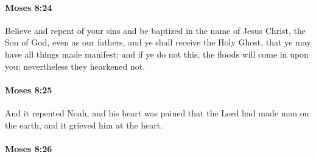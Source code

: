 
		\paragraph{Moses 8:24} %
			\label{MOSES-8-24}

			Believe and repent of your sins and be baptized in the name of Jesus Christ, the Son of God, even as our fathers, and ye shall receive the Holy Ghost, that ye may have all things made manifest; and if ye do not this, the floods will come in upon you; nevertheless they hearkened not.


		\paragraph{Moses 8:25} %
			\label{MOSES-8-25}

			And it repented Noah, and his heart was pained that the Lord had made man on the earth, and it grieved him at the heart.


		\paragraph{Moses 8:26} %
			\label{MOSES-8-26}

